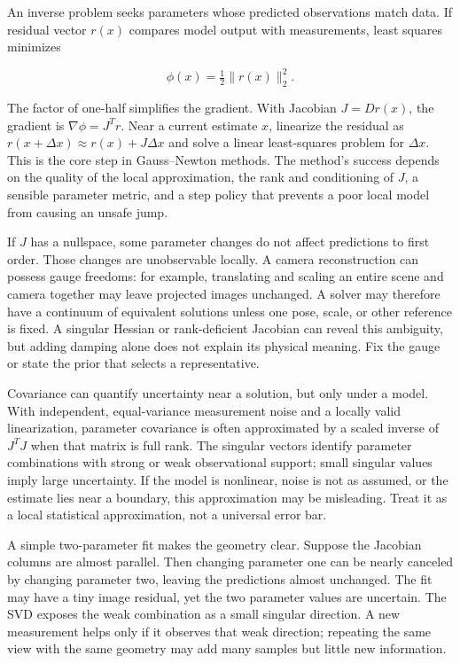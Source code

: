 An inverse problem seeks parameters whose predicted observations match data. If residual vector \(r(x)\) compares model output with measurements, least squares minimizes

\[
\phi(x)=\tfrac12\|r(x)\|_2^2.
\]

The factor of one-half simplifies the gradient. With Jacobian \(J=Dr(x)\), the gradient is \(\nabla\phi=J^Tr\). Near a current estimate \(x\), linearize the residual as \(r(x+\Delta x)\approx r(x)+J\Delta x\) and solve a linear least-squares problem for \(\Delta x\). This is the core step in Gauss--Newton methods. The method's success depends on the quality of the local approximation, the rank and conditioning of \(J\), a sensible parameter metric, and a step policy that prevents a poor local model from causing an unsafe jump.

If \(J\) has a nullspace, some parameter changes do not affect predictions to first order. Those changes are unobservable locally. A camera reconstruction can possess gauge freedoms: for example, translating and scaling an entire scene and camera together may leave projected images unchanged. A solver may therefore have a continuum of equivalent solutions unless one pose, scale, or other reference is fixed. A singular Hessian or rank-deficient Jacobian can reveal this ambiguity, but adding damping alone does not explain its physical meaning. Fix the gauge or state the prior that selects a representative.

Covariance can quantify uncertainty near a solution, but only under a model. With independent, equal-variance measurement noise and a locally valid linearization, parameter covariance is often approximated by a scaled inverse of \(J^TJ\) when that matrix is full rank. The singular vectors identify parameter combinations with strong or weak observational support; small singular values imply large uncertainty. If the model is nonlinear, noise is not as assumed, or the estimate lies near a boundary, this approximation may be misleading. Treat it as a local statistical approximation, not a universal error bar.

A simple two-parameter fit makes the geometry clear. Suppose the Jacobian columns are almost parallel. Then changing parameter one can be nearly canceled by changing parameter two, leaving the predictions almost unchanged. The fit may have a tiny image residual, yet the two parameter values are uncertain. The SVD exposes the weak combination as a small singular direction. A new measurement helps only if it observes that weak direction; repeating the same view with the same geometry may add many samples but little new information.

